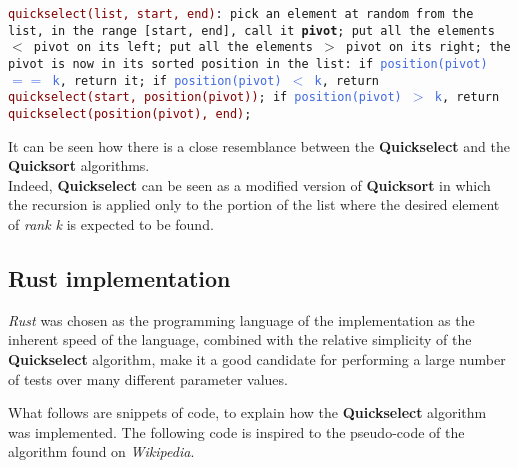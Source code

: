 \documentclass[
12pt,
a4paper,
oneside,
headinclude,
footinclude]{article}
\begin{document}
\texttt {\textcolor{Maroon}{quickselect(list, start, end)}: \newline
	\null\quad\quad pick an element at random from the list, \newline
    \null\quad\quad\quad\quad in the range [start, end], call it \textbf{pivot}; \newline
	\null\quad\quad put all the elements $<$ pivot on its left; \newline
	\null\quad\quad put all the elements $>$ pivot on its right; \newline
    \null\quad\quad the pivot is now in its sorted position in the list: \newline
    \null\quad\quad\quad\quad if \textcolor{RoyalBlue}{position(pivot) $==$ k}, return it; \newline
    \null\quad\quad\quad\quad if \textcolor{RoyalBlue}{position(pivot) $<$ k}, return \textcolor{Maroon}{quickselect(start, position(pivot))}; \newline
    \null\quad\quad\quad\quad if \textcolor{RoyalBlue}{position(pivot) $>$ k}, return \textcolor{Maroon}{quickselect(position(pivot), end)}; \newline}

It can be seen how there is a close resemblance between the \textbf{Quickselect} and the \textbf{Quicksort} algorithms. \\
Indeed, \textbf{Quickselect} can be seen as a modified version of \textbf{Quicksort} in which the recursion is applied only to the portion of the list where the desired element of \textit{rank k} is expected to be found.

\vspace{-5mm}
\subsection{Rust implementation}
\vspace{-5mm}
\textit{Rust} was chosen as the programming language of the implementation as the inherent speed of the language, combined with the relative simplicity of the \textbf{Quickselect} algorithm, make it a good candidate for performing a large number of tests over many different parameter values. 

What follows are snippets of code, to explain how the \textbf{Quickselect} algorithm was implemented.
The following code is inspired to the pseudo-code of the algorithm found on \textit{Wikipedia}. \cite{quickselect_wiki}
\end{document}
